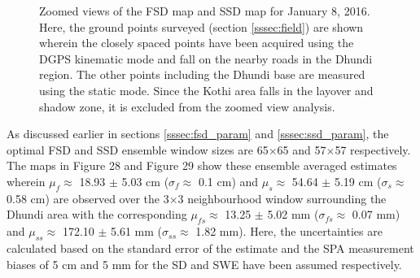\documentclass[review]{elsarticle}
\numberwithin{equation}{section}
\numberwithin{figure}{section}
\numberwithin{table}{section}
\begin{document}
\afterpage{\FloatBarrier}
\begin{figure}[htb]
    \centering
    \begin{subfigure}[t]{\textwidth}
        \caption{}
        \label{subfig:fsd_map}
    \end{subfigure}
    \begin{subfigure}[t]{\textwidth}
        \caption{}
        \label{subfig:ssd_map}
    \end{subfigure}
    \caption{Zoomed views of the  FSD map and  SSD map for January 8, 2016. Here, the ground points surveyed (section \ref{sssec:field}) are shown wherein the closely spaced points have been acquired using the DGPS kinematic mode and fall on the nearby roads in the Dhundi region. The other points including the Dhundi base are measured using the static mode. Since the Kothi area falls in the layover and shadow zone, it is excluded from the zoomed view analysis.}
    \label{fig:sd_maps}
\end{figure}

As discussed earlier in sections \ref{sssec:fsd_param} and \ref{sssec:ssd_param}, the optimal FSD and SSD ensemble window sizes are 65$\times$65 and 57$\times$57 respectively. The maps in Figure 28 and Figure 29 show these ensemble averaged
estimates wherein $μ_f \approx$ 18.93 $\pm$ 5.03 cm ($\sigma_f \approx$ 0.1 cm) and $\mu_s \approx$ 54.64 $\pm$ 5.19 cm ($\sigma_s \approx$ 0.58 cm) are observed over the 3$\times$3 neighbourhood window surrounding the Dhundi area with the corresponding $\mu_{fs} \approx$ 13.25 $\pm$ 5.02 mm ($\sigma_{fs} \approx$ 0.07 mm) and $\mu_{ss} \approx$ 172.10 $\pm$ 5.61 mm ($\sigma_{ss} \approx$ 1.82 mm). Here, the uncertainties are calculated based on the standard error of the estimate and the SPA measurement biases of 5 cm and 5 mm for the SD and SWE have been assumed respectively.
\end{document}
